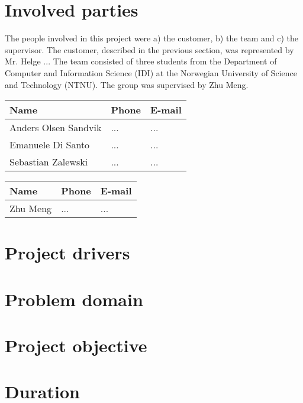 \section{Involved parties}

The people involved in this project were a) the customer, b) the team and c) the supervisor.
The customer, described in the previous section, was represented by Mr. Helge ...
The team consisted of three students from the Department of Computer and Information Science (IDI) at the Norwegian University of Science and Technology (NTNU). The group was supervised by Zhu Meng.

\begin{center}
\begin{tabular}{ l | l | l }
  \hline
  Name & Phone & E-mail \\
  \hline\noalign{\smallskip}\noalign{\smallskip}\hline
  Anders Olsen Sandvik	& ... & ... \\
  Emanuele Di Santo		& ... & ... \\
  Sebastian Zalewski	& ... & ... \\
  \hline
\end{tabular}
\end{center}

\begin{center}
\begin{tabular}{ l | l | l }
  \hline
  Name & Phone & E-mail \\
  \hline\noalign{\smallskip}\noalign{\smallskip}\hline
  Zhu Meng	& ... & ... \\
  \hline
\end{tabular}
\end{center}


\section{Project drivers}


\section{Problem domain}


\section{Project objective}

\section{Duration}